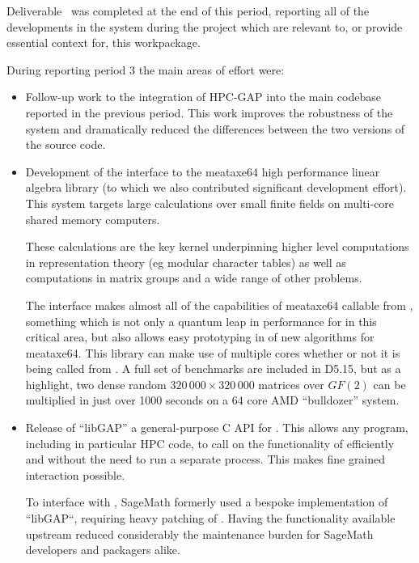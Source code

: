 Deliverable~ was completed at the end of this period,
reporting all of the developments in the \GAP system during the project which are relevant
to, or provide essential context for, this workpackage.

During reporting period 3 the main areas of effort were:
\begin{itemize}
\item Follow-up work to the integration of HPC-GAP into the main codebase reported in
  the previous period. This work improves the robustness of the system and dramatically reduced the
  differences between the two versions of the source code.
\item
  Development of the \GAP interface to the meataxe64 high performance linear algebra library (to which
  we also contributed significant development effort). This system targets large calculations over
  small finite fields on multi-core shared memory computers.

  These calculations are the key kernel underpinning higher level
  computations in representation theory (eg modular character tables)
  as well as computations in matrix groups and a wide range of other problems.
  
  The interface makes almost all of the
  capabilities of meataxe64 callable from \GAP, something which is not only a quantum leap in
  performance for \GAP in this critical area, but also allows easy prototyping in \GAP of new
  algorithms for meataxe64.  This library can make use of multiple cores whether or not it is being
  called from \HPCGAP. A full set of benchmarks are included in D5.15, but as a highlight, two
  dense random $320\,000\times 320\,000$ matrices over $GF(2)$ can be multiplied in just over 1000
  seconds on a 64 core AMD ``bulldozer'' system.
  \item Release of ``libGAP'' a general-purpose C API for \GAP. This allows any program, including in particular HPC code, to call on the
    functionality of \GAP efficiently and without the need to run a separate \GAP process. This makes
    fine grained interaction possible.

    To interface with \GAP, SageMath formerly used a bespoke
    implementation of ``libGAP``, requiring heavy patching of \GAP.
    Having the functionality available upstream reduced considerably
    the maintenance burden for SageMath developers and packagers
    alike.


\end{itemize}
